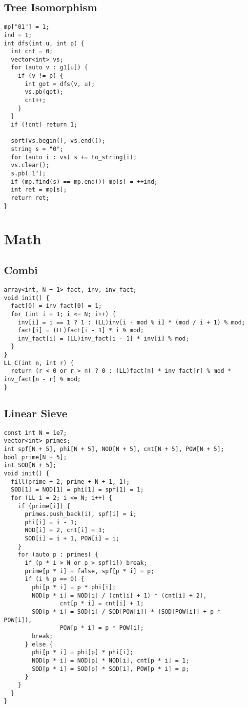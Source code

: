 \documentclass[FSZ,a4paper,onesided]{article}
\begin{document}
\begin{multicols*}{\COLS}
\subsection{Tree Isomorphism}
\begin{lstlisting}
mp["01"] = 1;
ind = 1;
int dfs(int u, int p) {
  int cnt = 0;
  vector<int> vs;
  for (auto v : g1[u]) {
    if (v != p) {
      int got = dfs(v, u);
      vs.pb(got);
      cnt++;
    }
  }
  if (!cnt) return 1;

  sort(vs.begin(), vs.end());
  string s = "0";
  for (auto i : vs) s += to_string(i);
  vs.clear();
  s.pb('1');
  if (mp.find(s) == mp.end()) mp[s] = ++ind;
  int ret = mp[s];
  return ret;
}
\end{lstlisting}
\section{Math}
\subsection{Combi}
\begin{lstlisting}
array<int, N + 1> fact, inv, inv_fact;
void init() {
  fact[0] = inv_fact[0] = 1;
  for (int i = 1; i <= N; i++) {
    inv[i] = i == 1 ? 1 : (LL)inv[i - mod % i] * (mod / i + 1) % mod;
    fact[i] = (LL)fact[i - 1] * i % mod;
    inv_fact[i] = (LL)inv_fact[i - 1] * inv[i] % mod;
  }
}
LL C(int n, int r) {
  return (r < 0 or r > n) ? 0 : (LL)fact[n] * inv_fact[r] % mod * inv_fact[n - r] % mod;
}
\end{lstlisting}
\subsection{Linear Sieve}
\begin{lstlisting}
const int N = 1e7;
vector<int> primes;
int spf[N + 5], phi[N + 5], NOD[N + 5], cnt[N + 5], POW[N + 5];
bool prime[N + 5];
int SOD[N + 5];
void init() {
  fill(prime + 2, prime + N + 1, 1);
  SOD[1] = NOD[1] = phi[1] = spf[1] = 1;
  for (LL i = 2; i <= N; i++) {
    if (prime[i]) {
      primes.push_back(i), spf[i] = i;
      phi[i] = i - 1;
      NOD[i] = 2, cnt[i] = 1;
      SOD[i] = i + 1, POW[i] = i;
    }
    for (auto p : primes) {
      if (p * i > N or p > spf[i]) break;
      prime[p * i] = false, spf[p * i] = p;
      if (i % p == 0) {
        phi[p * i] = p * phi[i];
        NOD[p * i] = NOD[i] / (cnt[i] + 1) * (cnt[i] + 2),
                cnt[p * i] = cnt[i] + 1;
        SOD[p * i] = SOD[i] / SOD[POW[i]] * (SOD[POW[i]] + p * POW[i]),
                POW[p * i] = p * POW[i];
        break;
      } else {
        phi[p * i] = phi[p] * phi[i];
        NOD[p * i] = NOD[p] * NOD[i], cnt[p * i] = 1;
        SOD[p * i] = SOD[p] * SOD[i], POW[p * i] = p;
      }
    }
  }
}


\end{lstlisting}
\end{multicols*}
\end{document}
